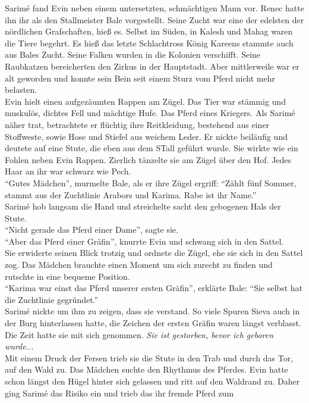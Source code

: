 Sarimé fand Evin neben einem untersetzten, schmächtigen Mann vor. Renec hatte ihn ihr als den 
Stallmeister Bale vorgestellt. Seine Zucht war eine der edelsten der nördlichen Grafschaften, hieß 
es. Selbst im Süden, in Kalesh und Mahag waren die Tiere begehrt. Es hieß das letzte Schlachtross 
König Kareens stammte auch aus Bales Zucht. Seine Falken wurden in die Kolonien verschifft. Seine 
Raubkatzen bereicherten den Zirkus in der Hauptstadt. Aber mittlerweile war er alt geworden und 
konnte sein Bein seit einem Sturz vom Pferd nicht mehr belasten.\\
Evin hielt einen aufgezäumten Rappen am Zügel. Das Tier war stämmig und muskulös, dichtes Fell und 
mächtige Hufe. Das Pferd eines Kriegers. Als Sarimé näher trat, betrachtete er flüchtig ihre 
Reitkleidung, bestehend aus einer Stoffweste, sowie Hose und Stiefel aus weichem Leder. Er nickte 
beiläufig und deutete auf eine Stute, die eben aus dem STall geführt wurde. Sie wirkte wie ein 
Fohlen neben Evin Rappen. Zierlich tänzelte sie am Zügel über den Hof. Jedes Haar an ihr war 
schwarz wie Pech.\\
``Gutes Mädchen'', murmelte Bale, als er ihre Zügel ergriff: ``Zählt fünf Sommer, stammt aus der 
Zuchtlinie Arabors und Karima. Rabe ist ihr Name.''\\
Sarimé hob langsam die Hand und streichelte sacht den gebogenen Hals der Stute.\\
``Nicht gerade das Pferd einer Dame'', sagte sie.\\
``Aber das Pferd einer Gräfin'', knurrte Evin und schwang sich in den Sattel.\\
Sie erwiderte seinen Blick trotzig und ordnete die Zügel, ehe sie sich in den Sattel zog. Das 
Mädchen brauchte einen Moment um sich zurecht zu finden und rutschte in eine bequeme Position.\\
``Karima war einst das Pferd unserer ersten Gräfin'', erklärte Bale: ``Sie selbst hat die 
Zuchtlinie gegründet.''\\
Sarimé nickte um ihm zu zeigen, dass sie verstand. So viele Spuren Sieva auch in der Burg 
hinterlassen hatte, die Zeichen der ersten Gräfin waren längst verblasst. Die Zeit hatte sie mit 
sich genommen. \textit{Sie ist gestorben, bevor ich geboren wurde...}\\
Mit einem Druck der Fersen trieb sie die Stute in den Trab und durch das Tor, auf den Wald zu. Das 
Mädchen suchte den Rhythmus des Pferdes. Evin hatte schon längst den Hügel hinter sich gelassen und 
ritt auf den Waldrand zu. Daher ging Sarimé das Risiko ein und trieb das ihr fremde Pferd zum 
